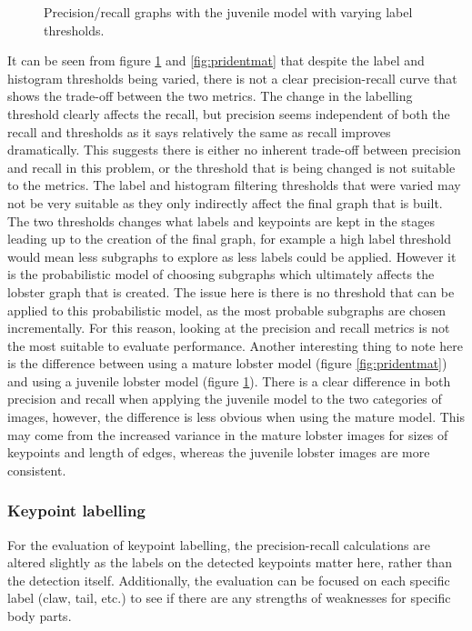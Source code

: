 \begin{figure}[H]
\centering
{}
\caption{Precision/recall graphs with the juvenile model with varying label thresholds.}
\label{fig:pridentjuv}
\end{figure}
\noindent
It can be seen from figure \ref{fig:pridentjuv} and \ref{fig:pridentmat} that despite the label and histogram thresholds being varied, there is not a clear precision-recall curve that shows the trade-off between the two metrics. The change in the labelling threshold clearly affects the recall, but precision seems independent of both the recall and thresholds as it says relatively the same as recall improves dramatically. This suggests there is either no inherent trade-off between precision and recall in this problem, or the threshold that is being changed is not suitable to the metrics. 
\n
The label and histogram filtering thresholds that were varied may not be very suitable as they only indirectly affect the final graph that is built. The two thresholds changes what labels and keypoints are kept in the stages leading up to the creation of the final graph, for example a high label threshold would mean less subgraphs to explore as less labels could be applied. However it is the probabilistic model of choosing subgraphs which ultimately affects the lobster graph that is created. The issue here is there is no threshold that can be applied to this probabilistic model, as the most probable subgraphs are chosen incrementally. For this reason, looking at the precision and recall metrics is not the most suitable to evaluate performance. 
\n
Another interesting thing to note here is the difference between using a mature lobster model (figure \ref{fig:pridentmat}) and using a juvenile lobster model (figure \ref{fig:pridentjuv}). There is a clear difference in both precision and recall when applying the juvenile model to the two categories of images, however, the difference is less obvious when using the mature model. This may come from the increased variance in the mature lobster images for sizes of keypoints and length of edges, whereas the juvenile lobster images are more consistent. 

\subsubsection{Keypoint labelling}
For the evaluation of keypoint labelling, the precision-recall calculations are altered slightly as the labels on the detected keypoints matter here, rather than the detection itself. Additionally, the evaluation can be focused on each specific label (claw, tail, etc.) to see if there are any strengths of weaknesses for specific body parts.

